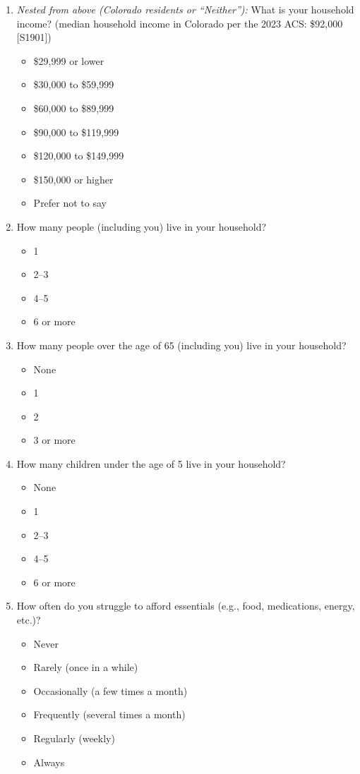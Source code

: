 \documentclass{article}
\begin{document}
\begin{enumerate}
\item \textit{Nested from above (Colorado residents or ``Neither''):} What is your household income?
(median household income in Colorado per the 2023 ACS: \$92,000 [S1901])
\begin{itemize}
  \item[\checkbox] \$29,999 or lower
  \item[\checkbox] \$30,000 to \$59,999
  \item[\checkbox] \$60,000 to \$89,999
  \item[\checkbox] \$90,000 to \$119,999
  \item[\checkbox] \$120,000 to \$149,999
  \item[\checkbox] \$150,000 or higher
  \item[\checkbox] Prefer not to say
\end{itemize}
 

\item How many people (including you) live in your household?
\begin{itemize}
  \item[\checkbox] 1
  \item[\checkbox] 2--3
  \item[\checkbox] 4--5
  \item[\checkbox] 6 or more
\end{itemize}
 

\item How many people over the age of 65 (including you) live in your household?
\begin{itemize}
  \item[\checkbox] None
  \item[\checkbox] 1
  \item[\checkbox] 2
  \item[\checkbox] 3 or more
\end{itemize}
 

\item How many children under the age of 5 live in your household?
\begin{itemize}
  \item[\checkbox] None
  \item[\checkbox] 1
  \item[\checkbox] 2--3
  \item[\checkbox] 4--5
  \item[\checkbox] 6 or more
\end{itemize}
 

\item How often do you struggle to afford essentials (e.g., food, medications, energy, etc.)?
\begin{itemize}
  \item[\checkbox] Never
  \item[\checkbox] Rarely (once in a while)
  \item[\checkbox] Occasionally (a few times a month)
  \item[\checkbox] Frequently (several times a month)
  \item[\checkbox] Regularly (weekly)
  \item[\checkbox] Always
\end{itemize}
 


\end{enumerate}
\end{document}
